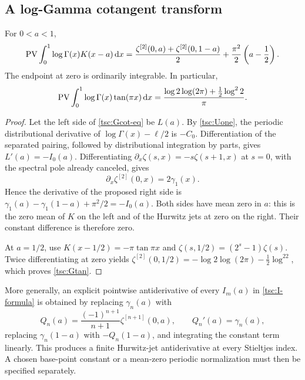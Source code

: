 \subsection{A log-Gamma cotangent transform}
\begin{proposition}\label{tsc:Gcot}
For $0<a<1$,
\begin{align}\label{tsc:Gcot-eq}
 \operatorname{PV}\int_0^1\log\Gamma(x)K(x-a)\,\mathrm d x
   =\frac{\zeta^{[2]}(0,a)+\zeta^{[2]}(0,1-a)}2
        +\frac{\pi^2}{2}\left(a-\frac12\right).
\end{align}
The endpoint at zero is ordinarily integrable. In particular,
\begin{equation}\label{tsc:Gtan}
 \operatorname{PV}\int_0^1\log\Gamma(x)\tan(\pi x)\,\mathrm d x
    =\frac{\log2\log(2\pi)+\tfrac12\log^22}{\pi}.
\end{equation}
\end{proposition}
\begin{proof}
Let the left side of \eqref{tsc:Gcot-eq} be $L(a)$.
By \eqref{tsc:Uone}, the periodic distributional derivative of
$\log\Gamma(x)-\ell/2$ is $-C_0$. Differentiation of the separated
pairing, followed by distributional integration by parts, gives
$L'(a)=-I_0(a)$.
Differentiating $\partial_x\zeta(s,x)=-s\zeta(s+1,x)$ at $s=0$, with
the spectral pole already canceled, gives
\[
 \partial_x\zeta^{[2]}(0,x)=2\gamma_1(x).
\]
Hence the derivative of the proposed right side is
$\gamma_1(a)-\gamma_1(1-a)+\pi^2/2=-I_0(a)$.
Both sides have mean zero in $a$: this is the zero mean of $K$ on the
left and of the Hurwitz jets at zero on the right. Their constant difference
is therefore zero.

At $a=1/2$, use $K(x-1/2)=-\pi\tan\pi x$ and
$\zeta(s,1/2)=(2^s-1)\zeta(s)$. Twice differentiating at zero yields
$\zeta^{[2]}(0,1/2)=-\log2\log(2\pi)-\tfrac12\log^22$, which proves
\eqref{tsc:Gtan}.
\end{proof}

More generally, an explicit pointwise antiderivative of every $I_m(a)$ in
\eqref{tsc:I-formula} is obtained by replacing $\gamma_n(a)$ with
\[
 Q_n(a)=\frac{(-1)^{n+1}}{n+1}\zeta^{[n+1]}(0,a),\qquad Q_n'(a)=\gamma_n(a),
\]
replacing $\gamma_n(1-a)$ with $-Q_n(1-a)$, and integrating the constant
term linearly. This produces a finite Hurwitz-jet antiderivative at every
Stieltjes index. A chosen base-point constant or a mean-zero periodic
normalization must then be specified separately.
